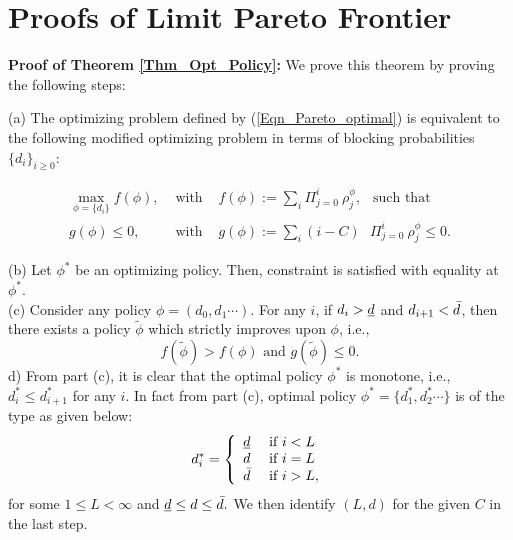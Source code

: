 %
 
\section{Proofs of Limit Pareto Frontier}  
\label{Appendix_pareto}
%


\noindent \textbf{Proof of Theorem \ref{Thm_Opt_Policy}:}  We prove this theorem by proving the following steps:
 
(a)  The optimizing problem defined by  (\ref{Eqn_Pareto_optimal}) is equivalent to the following modified optimizing problem in terms of blocking probabilities $\{ d_i \}_{i \geq 0}$:

\begin{eqnarray*}    
\max_{ \phi = \{ d_i \} } f(\phi),  &\mbox{ with }&   f(\phi)  := \sum_i \Pi_{j = 0}^i  \ \rho^\phi_j ,\ \  \mbox{ such that } \\
g(\phi)  \le 0 ,&\mbox{ with }&  g(\phi) :=
\sum_i   (i - C) \ \ \ \Pi_{j = 0}^i \  \rho^\phi_j  \leq 0.  
\end{eqnarray*}
  

(b) Let $\phi^*$ be an optimizing policy. Then, constraint is satisfied with equality at $\phi^*$. \\
(c) Consider any policy $\phi = (d_0, d_1 \cdots)$.  For any $i$,   if $d_i > {\underline d}$ and $d_{i+1}  < {\bar d}$, then there exists a policy ${\tilde \phi}$ which strictly improves upon 
$\phi$, i.e., 
$$
f({\tilde \phi} ) >  f(\phi)  \mbox{ and }   g({\tilde \phi} ) \le 0.
$$
d) From part (c), it is clear that the optimal policy $\phi^*$ is  monotone, i.e.,  $d_i^* \le  d_{i+1}^*$ for any $i$. In fact from part (c), optimal policy  $\phi^* = \{ d_1^*, d_2^* \cdots \}$ is of the type as given below: 
\begin{eqnarray}
\label{Eqn_pareto_optimal_policy_appendix}
d_i^* 
= \left \{ \begin{array}{llll}
{\underline d}   &\mbox{ if }  i < L \\
d          & \mbox{ if }   i = L \\
{\bar d}  & \mbox{ if }  i > L,
\end{array} \right .
\end{eqnarray}for some   $1 \le L < \infty$ and ${\underline d} \le  d \le {\bar d}. $  We then identify $(L, d)$ for the given $C$ in the last step.  
 
